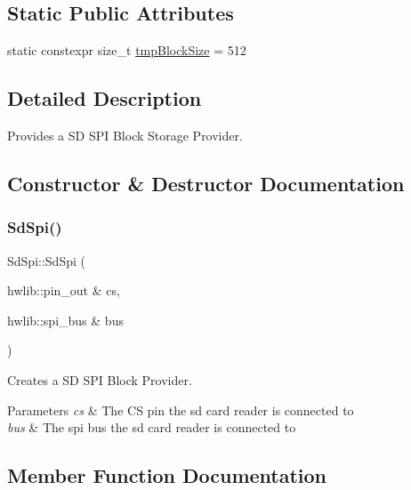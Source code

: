 \subsection*{Static Public Attributes}
\begin{DoxyCompactItemize}
\item 
static constexpr size\+\_\+t \hyperlink{class_sd_spi_a2eedef2fa6ec9844743e4e0de6f03261}{tmp\+Block\+Size} = 512
\end{DoxyCompactItemize}


\subsection{Detailed Description}
Provides a SD S\+PI Block Storage Provider. 

\subsection{Constructor \& Destructor Documentation}
\mbox{\label{class_sd_spi_a5a813ec0573cab136e4248787a46541a}} 
\subsubsection{\texorpdfstring{Sd\+Spi()}{SdSpi()}}
{\footnotesize\ttfamily Sd\+Spi\+::\+Sd\+Spi (\begin{DoxyParamCaption}\item[{hwlib\+::pin\+\_\+out \&}]{cs,  }\item[{hwlib\+::spi\+\_\+bus \&}]{bus }\end{DoxyParamCaption})}



Creates a SD S\+PI Block Provider. 


\begin{DoxyParams}{Parameters}
{\em cs} & The CS pin the sd card reader is connected to \\
\hline
{\em bus} & The spi bus the sd card reader is connected to \\
\hline
\end{DoxyParams}


\subsection{Member Function Documentation}
\mbox{\label{class_sd_spi_a90ee59c74ce983406c769b76c0083aa4}} 
